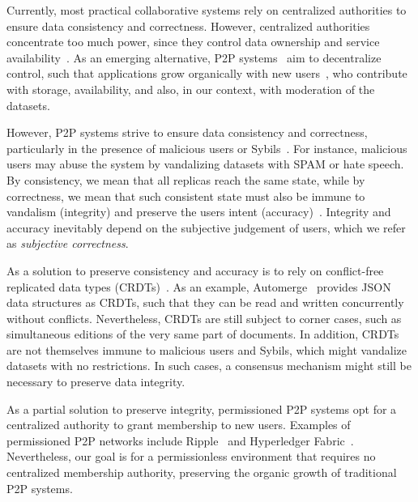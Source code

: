 \documentclass[12pt]{article}
\begin{document}
Currently, most practical collaborative systems rely on centralized authorities
to ensure data consistency and correctness.
However, centralized authorities concentrate too much power, since they control
data ownership and service availability~\cite{pincheira2022decentralized}.
As an emerging alternative, P2P systems~\cite{androutsellis2004survey} aim to
decentralize control, such that applications grow organically with new
users~\cite{rodrigues2010peer}, who contribute with storage, availability, and
also, in our context, with moderation of the datasets.

However, P2P systems strive to ensure data consistency and correctness,
particularly in the presence of malicious users or
Sybils~\cite{douceur2002sybil}.
For instance, malicious users may abuse the system by vandalizing datasets with
SPAM or hate speech.
By consistency, we mean that all replicas reach the same state, while by
correctness, we mean that such consistent state must also be immune to
vandalism (integrity) and preserve the users intent
(accuracy)~\cite{litt2022peritext}.
Integrity and accuracy inevitably depend on the subjective judgement of users,
which we refer as \emph{subjective correctness}.

As a solution to preserve consistency and accuracy is to rely on conflict-free
replicated data types (CRDTs)~\cite{shapiro2011conflict}.
As an example, Automerge~\cite{kleppmann2018automerge} provides JSON data
structures as CRDTs, such that they can be read and written concurrently
without conflicts.
Nevertheless, CRDTs are still subject to corner cases, such as simultaneous
editions of the very same part of documents.
In addition, CRDTs are not themselves immune to malicious users and Sybils,
which might vandalize datasets with no restrictions.
In such cases, a consensus mechanism might still be necessary to preserve data
integrity.

As a partial solution to preserve integrity, permissioned P2P systems opt for a
centralized authority to grant membership to new users.
Examples of permissioned P2P networks include Ripple~\cite{schwartz2014ripple}
and Hyperledger Fabric~\cite{androulaki2018hyperledger}.
%
Nevertheless, our goal is for a permissionless environment that requires no
centralized membership authority, preserving the organic growth of traditional
P2P systems.
\end{document}
